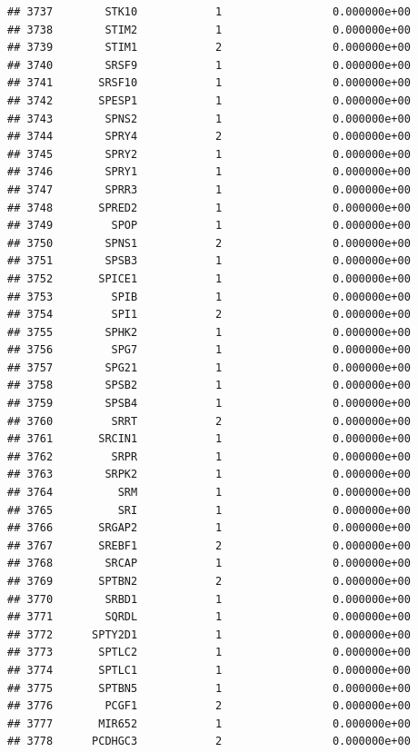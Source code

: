 \documentclass[
]{article}
\begin{document}
\begin{verbatim}
## 3737        STK10            1                 0.000000e+00
## 3738        STIM2            1                 0.000000e+00
## 3739        STIM1            2                 0.000000e+00
## 3740        SRSF9            1                 0.000000e+00
## 3741       SRSF10            1                 0.000000e+00
## 3742       SPESP1            1                 0.000000e+00
## 3743        SPNS2            1                 0.000000e+00
## 3744        SPRY4            2                 0.000000e+00
## 3745        SPRY2            1                 0.000000e+00
## 3746        SPRY1            1                 0.000000e+00
## 3747        SPRR3            1                 0.000000e+00
## 3748       SPRED2            1                 0.000000e+00
## 3749         SPOP            1                 0.000000e+00
## 3750        SPNS1            2                 0.000000e+00
## 3751        SPSB3            1                 0.000000e+00
## 3752       SPICE1            1                 0.000000e+00
## 3753         SPIB            1                 0.000000e+00
## 3754         SPI1            2                 0.000000e+00
## 3755        SPHK2            1                 0.000000e+00
## 3756         SPG7            1                 0.000000e+00
## 3757        SPG21            1                 0.000000e+00
## 3758        SPSB2            1                 0.000000e+00
## 3759        SPSB4            1                 0.000000e+00
## 3760         SRRT            2                 0.000000e+00
## 3761       SRCIN1            1                 0.000000e+00
## 3762         SRPR            1                 0.000000e+00
## 3763        SRPK2            1                 0.000000e+00
## 3764          SRM            1                 0.000000e+00
## 3765          SRI            1                 0.000000e+00
## 3766       SRGAP2            1                 0.000000e+00
## 3767       SREBF1            2                 0.000000e+00
## 3768        SRCAP            1                 0.000000e+00
## 3769       SPTBN2            2                 0.000000e+00
## 3770        SRBD1            1                 0.000000e+00
## 3771        SQRDL            1                 0.000000e+00
## 3772      SPTY2D1            1                 0.000000e+00
## 3773       SPTLC2            1                 0.000000e+00
## 3774       SPTLC1            1                 0.000000e+00
## 3775       SPTBN5            1                 0.000000e+00
## 3776        PCGF1            2                 0.000000e+00
## 3777       MIR652            1                 0.000000e+00
## 3778      PCDHGC3            2                 0.000000e+00

\end{verbatim}
\end{document}
